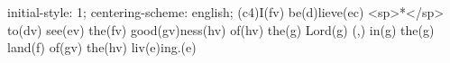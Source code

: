 initial-style: 1;
centering-scheme: english;
(c4)I(fv) be(d)lieve(ec) <sp>*</sp> to(dv) see(ev) the(fv) good(gv)ness(hv) of(hv) the(g) Lord(g) (,) in(g) the(g) land(f) of(gv) the(hv) liv(e)ing.(e)
